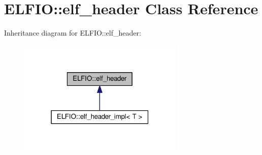 \hypertarget{class_e_l_f_i_o_1_1elf__header}{}\section{E\+L\+F\+IO\+:\+:elf\+\_\+header Class Reference}
\label{class_e_l_f_i_o_1_1elf__header}


Inheritance diagram for E\+L\+F\+IO\+:\+:elf\+\_\+header\+:\nopagebreak
\begin{figure}[H]
\begin{center}
\leavevmode
\includegraphics[width=223pt]{class_e_l_f_i_o_1_1elf__header__inherit__graph}
\end{center}
\end{figure}
